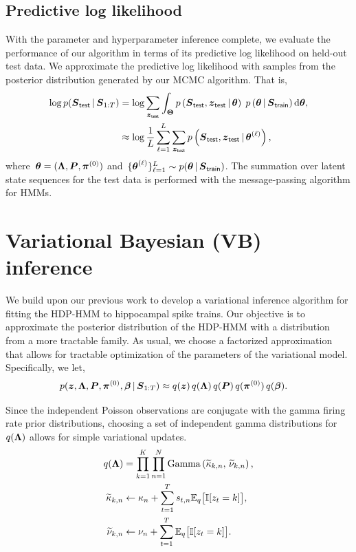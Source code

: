 \subsection{Predictive log likelihood}
With the parameter and hyperparameter inference complete, we evaluate
the performance of our algorithm in terms of its predictive log
likelihood on held-out test data. We approximate the predictive log
likelihood with samples from the posterior distribution generated by
our MCMC algorithm. That is,
\begin{align*}
\log p(\boldsymbol{S}_{\mathsf{test}} \,|\, \boldsymbol{S}_{1:T}) &= \log \sum_{\boldsymbol{z}_{\mathsf{test}}} \int_{\boldsymbol{\Theta}} p\left(\boldsymbol{S}_{\mathsf{test}}, \boldsymbol{z}_{\mathsf{test}} \,|\, \boldsymbol{\theta} \right) \; p\left(\boldsymbol{\theta} \,|\, \boldsymbol{S}_{\mathsf{train}} \right) \mathrm{d}\boldsymbol{\theta}, \\
&\approx \log \frac{1}{L} \sum_{\ell=1}^L \sum_{\boldsymbol{z}_{\mathsf{test}}} p\left(\boldsymbol{S}_{\mathsf{test}},  \boldsymbol{z}_{\mathsf{test}} \,|\, \boldsymbol{\theta}^{(\ell)} \right),
\end{align*}
where~${\boldsymbol{\theta}=(\boldsymbol{\Lambda}, \boldsymbol{P}, \boldsymbol{\pi}^{(0)})}$ and~$\{\boldsymbol{\theta}^{(\ell)} \}_{\ell=1}^L
\sim p(\boldsymbol{\theta} \,|\, \boldsymbol{S}_{\mathsf{train}})$. The summation over latent state
sequences for the test data is performed with the message-passing
algorithm for HMMs.

\section{Variational Bayesian (VB) inference}



We build upon our previous work \citep{Chen12a,Chen14,Johnson14} to
develop a variational inference algorithm for fitting the HDP-HMM to
hippocampal spike trains. Our objective is to approximate the
posterior distribution of the HDP-HMM with a distribution from a more
tractable family. As usual, we choose a factorized approximation that
allows for tractable optimization of the parameters of the variational
model. Specifically, we let,
\begin{align*}
  p(\boldsymbol{z}, \boldsymbol{\Lambda}, \boldsymbol{P}, \boldsymbol{\pi}^{(0)}, \boldsymbol{\beta} \,|\, \boldsymbol{S}_{1:T}) 
  &\approx q(\boldsymbol{z}) \, q(\boldsymbol{\Lambda}) \, q(\boldsymbol{P}) \, q(\boldsymbol{\pi}^{(0)}) \, q(\boldsymbol{\beta}).
\end{align*}

Since the independent Poisson observations are conjugate with the
gamma firing rate prior distributions, choosing a set of independent
gamma distributions for~$q(\boldsymbol{\Lambda})$ allows for simple variational
updates.
\begin{align*}
  q(\boldsymbol{\Lambda}) &= \prod_{k=1}^K \prod_{n=1}^N \mathrm{Gamma}\left(\widetilde{\kappa}_{k,n},\, \widetilde{\nu}_{k,n} \right), \\
  \widetilde{\kappa}_{k,n} &\leftarrow \kappa_n + \sum_{t=1}^T s_{t,n} \mathbb{E}_q\big[\mathbb{I}[z_t=k]\big], \\
  \widetilde{\nu}_{k,n} &\leftarrow \nu_n + \sum_{t=1}^T \mathbb{E}_q\big[\mathbb{I}[z_t=k]\big].
\end{align*}

